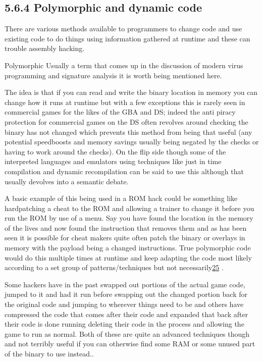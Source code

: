 \documentclass[
]{book}
\begin{document}
\hypertarget{polymorphic-and-dynamic-code}{%
\subsection{5.6.4 Polymorphic and dynamic code}\label{polymorphic-and-dynamic-code}}

There are various methods available to programmers to change code and use existing code to do things using information gathered at runtime and these can trouble assembly hacking.

Polymorphic Usually a term that comes up in the discussion of modern virus programming and signature analysis it is worth being mentioned here.

The idea is that if you can read and write the binary location in memory you can change how it runs at runtime but with a few exceptions this is rarely seen in commercial games for the likes of the GBA and DS; indeed the anti piracy protection for commercial games on the DS often revolves around checking the binary has not changed which prevents this method from being that useful (any potential speedboosts and memory savings usually being negated by the checks or having to work around the checks). On the flip side though some of the interpreted languages and emulators using techniques like just in time compilation and dynamic recompilation can be said to use this although that usually devolves into a semantic debate.

A basic example of this being used in a ROM hack could be something like hardpatching a cheat to the ROM and allowing a trainer to change it before you run the ROM by use of a menu. Say you have found the location in the memory of the lives and now found the instruction that removes them and as has been seen it is possible for cheat makers quite often patch the binary or overlays in memory with the payload being a changed instructions. True polymorphic code would do this multiple times at runtime and keep adapting the code most likely according to a set group of patterns/techniques but not necessarily\href{romhacking202026.html\#fn25x0}{25} .

Some hackers have in the past swapped out portions of the actual game code, jumped to it and had it run before swapping out the changed portion back for the original code and jumping to wherever things need to be and others have compressed the code that comes after their code and expanded that back after their code is done running deleting their code in the process and allowing the game to run as normal. Both of these are quite an advanced techniques though and not terribly useful if you can otherwise find some RAM or some unused part of the binary to use instead..
\end{document}
